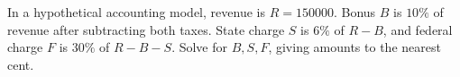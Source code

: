In a hypothetical accounting model, revenue is $R=150000$. Bonus $B$ is $10\%$ of revenue after subtracting both taxes. State charge $S$ is $6\%$ of $R-B$, and federal charge $F$ is $30\%$ of $R-B-S$. Solve for $B,S,F$, giving amounts to the nearest cent.
